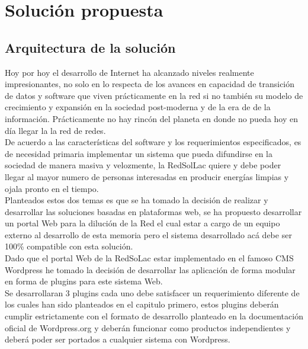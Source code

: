 \chapter{Solución propuesta}
\label{solucion}
\section{Arquitectura de la solución}
Hoy por hoy el desarrollo de Internet ha alcanzado niveles realmente impresionantes, no solo en lo respecta de los avances en capacidad de transición de datos y software que viven prácticamente en la red si no también su modelo de crecimiento y expansión en la sociedad post-moderna y de la era de de la información. Prácticamente no hay rincón del planeta en donde no pueda hoy en día llegar la la red de redes.\\
De acuerdo a las características del software y los requerimientos especificados, es de necesidad primaria implementar un sistema que pueda difundirse en la sociedad de manera masiva y velozmente, la RedSolLac quiere y debe poder llegar al mayor numero de personas interesadas en producir energías limpias y ojala pronto en el tiempo.\\
Planteados estos dos temas es que se ha tomado la decisión de realizar y desarrollar las soluciones basadas en plataformas web, se ha propuesto desarrollar un portal Web para la dilución de la Red el cual estar a cargo de un equipo externo al desarrollo de esta memoria pero el sistema desarrollado acá debe ser 100\% compatible con esta solución.\\
Dado que el portal Web de la RedSoLac estar implementado en el famoso CMS Wordpress he tomado la decisión de desarrollar las aplicación de forma modular en forma de plugins para este sistema Web.\\
Se desarrollaran 3 plugins cada uno debe satisfacer un requerimiento diferente de los cuales han sido planteados en el capitulo primero, estos plugins deberán cumplir estrictamente con el formato de desarrollo planteado en la documentación oficial de Wordpress.org y deberán funcionar como productos independientes y deberá poder ser portados a cualquier sistema con Wordpress.\\

